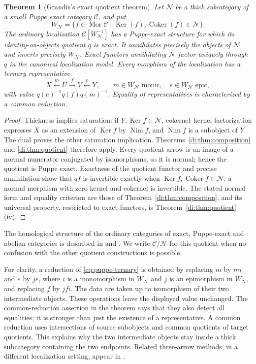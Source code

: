 \documentclass[11pt,reqno,a4paper]{amsart}
\newtheorem{theorem}{Theorem}[section]
\theoremstyle{definition}
\theoremstyle{remark}
\newcommand{\C}{\mathcal{C}}
\newcommand{\N}{\mathcal{N}}
\newcommand{\0}{\mathbf{0}}
\renewcommand{\1}{\mathbf{1}}
\DeclareMathOperator{\Mor}{Mor}
\DeclareMathOperator{\Ker}{Ker}
\DeclareMathOperator{\Coker}{Coker}
\newcommand{\Nim}{\operatorname{Nim}}
\begin{document}
\begin{theorem}[Grandis's exact quotient theorem]\label{thm:puppe-localization}
Let $\N$ be a thick subcategory of a small Puppe exact category $\C$,
and put
\[
 W_{\N}=\{f\in\Mor\C\mid\Ker(f),\Coker(f)\in\N\}.
\]
The ordinary localization $\C[W_{\N}^{-1}]$ has a Puppe-exact
structure for which its identity-on-objects quotient $q$ is exact.
It annihilates precisely the objects of $\N$ and inverts precisely
$W_{\N}$. Exact functors annihilating $\N$ factor uniquely through
$q$ in the canonical localization model. Every morphism of the
localization has a ternary representative
\begin{equation}\label{eq:puppe-ternary}
 X\xleftarrow{m}U\xrightarrow{f}V\xleftarrow{e}Y,
 \qquad m\in W_{\N}\text{ monic},\quad
 e\in W_{\N}\text{ epic},
\end{equation}
with value $q(e)^{-1}q(f)q(m)^{-1}$. Equality of representatives is
characterized by a common reduction.
\end{theorem}

\begin{proof}
Thickness implies saturation: if $Y,\Ker f\in\N$, cokernel--kernel
factorization expresses $X$ as an extension of $\Ker f$ by
$\Nim f$, and $\Nim f$ is a subobject of $Y$. The dual proves
the other saturation implication. Theorems~\ref{di:thm:composition}
and \ref{di:thm:quotient} therefore apply. Every quotient arrow is
an image of a normal numerator conjugated by isomorphisms, so it is
normal; hence the quotient is Puppe exact. Exactness of the quotient
functor and precise annihilation show that $qf$ is invertible exactly
when $\Ker f,\Coker f\in\N$: a normal morphism with zero kernel
and cokernel is invertible. The stated normal form and equality
criterion are those of Theorem~\ref{di:thm:composition}, and its
universal property, restricted to exact functors, is
Theorem~\ref{di:thm:quotient}(iv).
\end{proof}

The homological structure of the ordinary categories of exact,
Puppe-exact and abelian categories is described in
\cite[Section~1.9, p.~146]{Grandis92} and
\cite[Section~5.6]{Grandis13}.
We write $\C/\N$ for this quotient when no confusion with the
other quotient constructions is possible.

For clarity, a reduction of \eqref{eq:puppe-ternary} is obtained by
replacing $m$ by $mi$ and $e$ by $je$, where $i$ is a monomorphism
in $W_{\N}$ and $j$ is an epimorphism in $W_{\N}$, and replacing
$f$ by $jfi$. The data are taken up to isomorphism of their two
intermediate objects. These operations leave the displayed value
unchanged. The common-reduction assertion in the theorem says that
they also detect all equalities; it is stronger than just the
existence of a representative. A common reduction uses intersections
of source subobjects and common quotients of target quotients.
This explains why the two intermediate objects stay inside a thick
subcategory containing the two endpoints. Related three-arrow
methods, in a different localization setting, appear in \cite{Tho11}.
\end{document}
